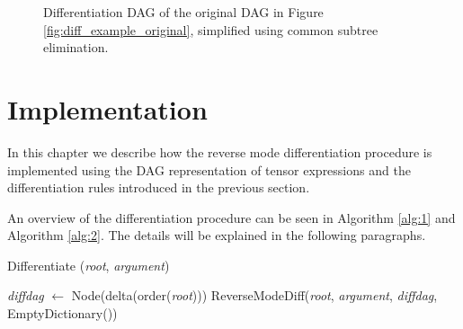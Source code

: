 \documentclass[12pt, a4paper]{report}
\begin{document}
\begin{figure}
    \centering
    \caption{Differentiation DAG of the original DAG in Figure \ref{fig:diff_example_original}, simplified using common subtree elimination.}
    \label{fig:diff_example_final}
\end{figure}

\FloatBarrier
\section{Implementation}
In this chapter we describe how the reverse mode differentiation procedure is implemented using the DAG representation of tensor expressions and the differentiation rules introduced in the previous section.

An overview of the differentiation procedure can be seen in Algorithm \ref{alg:1} and Algorithm \ref{alg:2}.
The details will be explained in the following paragraphs.

\begin{algorithm}
    \caption{Differentiate (\textit{root}, \textit{argument})}\label{alg:1}
    \begin{algorithmic}
        \State \textit{diffdag} $\gets$ Node(delta(order(\textit{root})))
        \State ReverseModeDiff(\textit{root}, \textit{argument}, \textit{diffdag}, EmptyDictionary())
    \end{algorithmic}
\end{algorithm}
\end{document}

